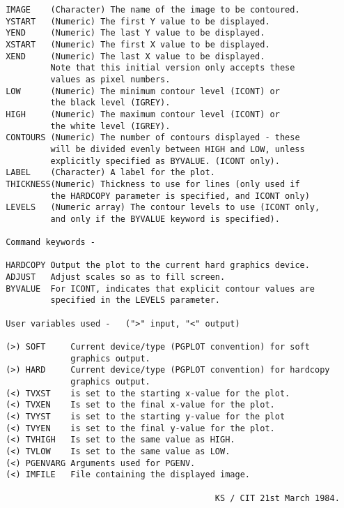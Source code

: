 \begin{description}
\begin{verbatim}
 IMAGE    (Character) The name of the image to be contoured.
 YSTART   (Numeric) The first Y value to be displayed.
 YEND     (Numeric) The last Y value to be displayed.
 XSTART   (Numeric) The first X value to be displayed.
 XEND     (Numeric) The last X value to be displayed.
          Note that this initial version only accepts these
          values as pixel numbers.
 LOW      (Numeric) The minimum contour level (ICONT) or
          the black level (IGREY).
 HIGH     (Numeric) The maximum contour level (ICONT) or
          the white level (IGREY).
 CONTOURS (Numeric) The number of contours displayed - these
          will be divided evenly between HIGH and LOW, unless
          explicitly specified as BYVALUE. (ICONT only).
 LABEL    (Character) A label for the plot.
 THICKNESS(Numeric) Thickness to use for lines (only used if
          the HARDCOPY parameter is specified, and ICONT only)
 LEVELS   (Numeric array) The contour levels to use (ICONT only,
          and only if the BYVALUE keyword is specified).

 Command keywords -

 HARDCOPY Output the plot to the current hard graphics device.
 ADJUST   Adjust scales so as to fill screen.
 BYVALUE  For ICONT, indicates that explicit contour values are
          specified in the LEVELS parameter.

 User variables used -   (">" input, "<" output)

 (>) SOFT     Current device/type (PGPLOT convention) for soft
              graphics output.
 (>) HARD     Current device/type (PGPLOT convention) for hardcopy
              graphics output.
 (<) TVXST    is set to the starting x-value for the plot.
 (<) TVXEN    Is set to the final x-value for the plot.
 (<) TVYST    is set to the starting y-value for the plot
 (<) TVYEN    is set to the final y-value for the plot.
 (<) TVHIGH   Is set to the same value as HIGH.
 (<) TVLOW    Is set to the same value as LOW.
 (<) PGENVARG Arguments used for PGENV.
 (<) IMFILE   File containing the displayed image.

                                           KS / CIT 21st March 1984.
\end{verbatim}
\end{description}
